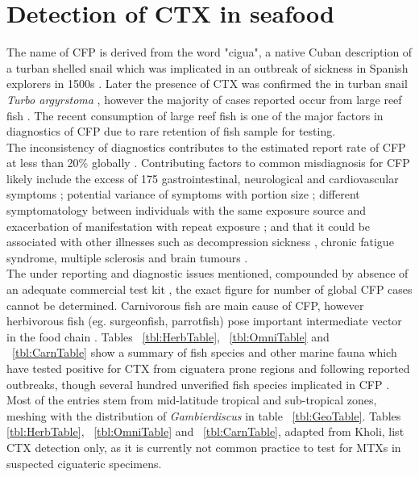 \documentclass[12pt]{article}
\begin{document}
\section{Detection of CTX in seafood}
The name of CFP is derived from the word "cigua", a native Cuban description of a turban shelled snail which was implicated in an outbreak of sickness in Spanish explorers in 1500s \cite{gudger1930poisonous}. Later the presence of CTX was confirmed the in turban snail \emph{Turbo argyrstoma} \cite{yasumoto1976toxicity}, however the majority of cases reported occur from large reef fish \cite{hokama2001ciguatera,lewis2001changing,dechraoui2005use,laurent2005ciguatera}. The recent consumption of large reef fish is one of the major factors in diagnostics of CFP due to rare retention of fish sample for testing. \\
The inconsistency of diagnostics contributes to the estimated report rate of CFP at less than 20\% globally \cite{dickey2010ciguatera}. Contributing factors to common misdiagnosis for CFP likely include the excess of 175 gastrointestinal, neurological and cardiovascular symptoms \cite{sims1987theoretical}; potential variance of symptoms with portion size \cite{wong2008features,mak2013pacific}; different symptomatology between individuals with the same exposure source and exacerbation of manifestation with repeat exposure \cite{bagnis1979clinical,glaziou1993study}; and that it could be associated with other illnesses such as decompression sickness \cite{adams1993outbreak}, chronic fatigue syndrome, multiple sclerosis \cite{lindsay1997chronic,ting2001ciguatera} and brain tumours \cite{lindsay1997chronic}. \\
The under reporting and diagnostic issues mentioned, compounded by absence of an adequate commercial test kit \cite{wong2005study}, the exact figure for number of global CFP cases cannot be determined. Carnivorous fish are main cause of CFP, however herbivorous fish (eg. surgeonfish, parrotfish) pose important intermediate vector in the food chain \cite{cruz2006macroalgal,randall1958review,mak2013pacific}.%
Tables ~\ref{tbl:HerbTable}, ~\ref{tbl:OmniTable} and ~\ref{tbl:CarnTable} show a summary of fish species and other marine fauna which have tested positive for CTX from ciguatera prone regions and following reported outbreaks, though several hundred unverified fish species implicated in CFP \cite{fao2004ciguatera}. %
Most of the entries stem from mid-latitude tropical and sub-tropical zones, meshing with the distribution of \emph{Gambierdiscus} in table ~\ref{tbl:GeoTable}. Tables \ref{tbl:HerbTable}, ~\ref{tbl:OmniTable} and ~\ref{tbl:CarnTable}, adapted from Kholi, \cite{kohli2013Gambierdiscus} list CTX detection only, as it is currently not common practice to test for MTXs in suspected ciguateric specimens. 
\end{document}
